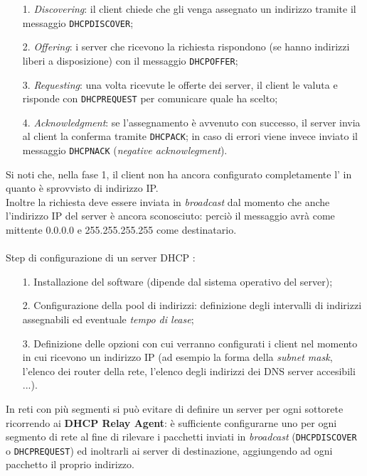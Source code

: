 \documentclass[a4paper,11pt]{article}
\def\code#1{\texttt{#1}}
\def\vedi#1{\nameref{#1}}
\def\italic#1{\textit{#1}}
\begin{document}
\begin{itemize}
	\item[1.] \italic{Discovering}: il client chiede che gli venga assegnato un indirizzo tramite il messaggio \code{DHCPDISCOVER};
	\item[2.] \italic{Offering}: i server che ricevono la richiesta rispondono (se hanno indirizzi liberi a disposizione) con il messaggio \code{DHCPOFFER};
	\item[3.] \italic{Requesting}: una volta ricevute le offerte dei server, il client le valuta e risponde con \code{DHCPREQUEST} per comunicare quale ha scelto;
	\item[4.] \italic{Acknowledgment}: se l'assegnamento è avvenuto con successo, il server invia al client la conferma tramite \code{DHCPACK}; in caso di errori viene invece inviato il messaggio \code{DHCPNACK} (\italic{negative acknowlegment}).
\end{itemize}
Si noti che, nella fase 1, il client non ha ancora configurato completamente l'\vedi{Internet protocol suite (TCP/IP)} in quanto è sprovvisto di indirizzo IP.
\\Inoltre la richiesta deve essere inviata in \italic{broadcast} dal momento che anche l'indirizzo IP del server è ancora sconosciuto: perciò il messaggio avrà come mittente 0.0.0.0 e 255.255.255.255 come destinatario.
\\\\Step di configurazione di un server DHCP :
\begin{itemize}
	\item[1.] Installazione del software (dipende dal sistema operativo del server);
	\item[2.] Configurazione della pool di indirizzi: definizione degli intervalli di indirizzi assegnabili ed eventuale \italic{tempo di lease};
	\item[3.] Definizione delle opzioni con cui verranno configurati i client nel momento in cui ricevono un indirizzo IP (ad esempio la forma della \italic{subnet mask}, l'elenco dei router della rete, l'elenco degli indirizzi dei DNS server accesibili ...).
\end{itemize}
In reti con più segmenti si può evitare di definire un server per ogni sottorete ricorrendo ai \textbf{DHCP Relay Agent}: è sufficiente configurarne uno per ogni segmento di rete al fine di rilevare i pacchetti inviati in \italic{broadcast} (\code{DHCPDISCOVER} o \code{DHCPREQUEST}) ed inoltrarli ai server di destinazione, aggiungendo ad ogni pacchetto il proprio indirizzo.\\
\end{document}
